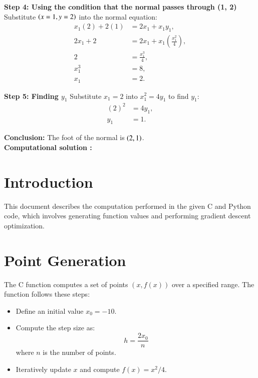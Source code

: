 \documentclass[journal]{IEEEtran}
\begin{document}
\textbf{Step 4: Using the condition that the normal passes through (1, 2)} \\
Substitute $\left(x = 1, y = 2\right)$ into the normal equation:
\begin{align}
    x_1(2) + 2(1) &= 2x_1 + x_1y_1, \\
    2x_1 + 2 &= 2x_1 + x_1\left(\frac{x_1^2}{4}\right), \\
    2 &= \frac{x_1^3}{4}, \\
    x_1^3 &= 8, \\
    x_1 &= 2.
\end{align}

\textbf{Step 5: Finding $y_1$}  
Substitute $x_1 = 2$ into $x_1^2 = 4y_1$ to find $y_1$:
\begin{align}
    (2)^2 &= 4y_1, \\
    y_1 &= 1.
\end{align}

\textbf{Conclusion:}  
The foot of the normal is $\left(2, 1\right)$.
\\
\textbf{Computational solution :}\\
\section{Introduction}
This document describes the computation performed in the given C and Python code, which involves generating function values and performing gradient descent optimization.

\section{Point Generation}
The C function computes a set of points $(x, f(x))$ over a specified range. The function follows these steps:
\begin{itemize}
    \item Define an initial value $x_0 = -10$.
    \item Compute the step size as:
    \begin{equation}
        h = \frac{2x_0}{n}
    \end{equation}
    where $n$ is the number of points.
    \item Iteratively update $x$ and compute $f(x) = x^2/4$.
\end{itemize}
\end{document}
